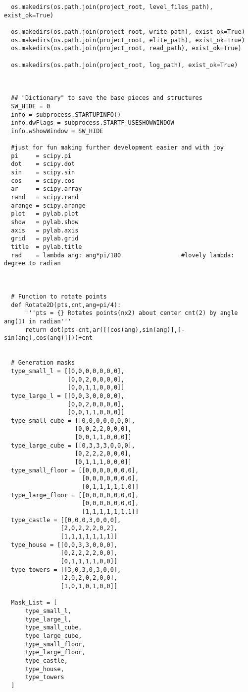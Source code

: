 \begin{verbatim}
  os.makedirs(os.path.join(project_root, level_files_path), exist_ok=True)

  os.makedirs(os.path.join(project_root, write_path), exist_ok=True)
  os.makedirs(os.path.join(project_root, elite_path), exist_ok=True)
  os.makedirs(os.path.join(project_root, read_path), exist_ok=True)

  os.makedirs(os.path.join(project_root, log_path), exist_ok=True)



  ## "Dictionary" to save the base pieces and structures
  SW_HIDE = 0
  info = subprocess.STARTUPINFO()
  info.dwFlags = subprocess.STARTF_USESHOWWINDOW
  info.wShowWindow = SW_HIDE

  #just for fun making further development easier and with joy
  pi     = scipy.pi
  dot    = scipy.dot
  sin    = scipy.sin
  cos    = scipy.cos
  ar     = scipy.array
  rand   = scipy.rand
  arange = scipy.arange
  plot   = pylab.plot
  show   = pylab.show
  axis   = pylab.axis
  grid   = pylab.grid
  title  = pylab.title
  rad    = lambda ang: ang*pi/180                 #lovely lambda: degree to radian



  # Function to rotate points
  def Rotate2D(pts,cnt,ang=pi/4):
      '''pts = {} Rotates points(nx2) about center cnt(2) by angle ang(1) in radian'''
      return dot(pts-cnt,ar([[cos(ang),sin(ang)],[-sin(ang),cos(ang)]]))+cnt


  # Generation masks
  type_small_l = [[0,0,0,0,0,0,0],
                  [0,0,2,0,0,0,0],
                  [0,0,1,1,0,0,0]]
  type_large_l = [[0,0,3,0,0,0,0],
                  [0,0,2,0,0,0,0],
                  [0,0,1,1,0,0,0]]
  type_small_cube = [[0,0,0,0,0,0,0],
                    [0,0,2,2,0,0,0],
                    [0,0,1,1,0,0,0]]
  type_large_cube = [[0,3,3,3,0,0,0],
                    [0,2,2,2,0,0,0],
                    [0,1,1,1,0,0,0]]
  type_small_floor = [[0,0,0,0,0,0,0],
                      [0,0,0,0,0,0,0],
                      [0,1,1,1,1,1,0]]
  type_large_floor = [[0,0,0,0,0,0,0],
                      [0,0,0,0,0,0,0],
                      [1,1,1,1,1,1,1]]
  type_castle = [[0,0,0,3,0,0,0],
                [2,0,2,2,2,0,2],
                [1,1,1,1,1,1,1]]
  type_house = [[0,0,3,3,0,0,0],
                [0,2,2,2,2,0,0],
                [0,1,1,1,1,0,0]]
  type_towers = [[3,0,3,0,3,0,0],
                [2,0,2,0,2,0,0],
                [1,0,1,0,1,0,0]]

  Mask_List = [
      type_small_l,
      type_large_l,
      type_small_cube,
      type_large_cube,
      type_small_floor,
      type_large_floor,
      type_castle,
      type_house,
      type_towers
  ]


\end{verbatim}
